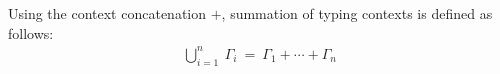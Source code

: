 \begin{definition}
Using the context concatenation $+$, summation of typing contexts is defined as follows:
\begin{align*}
\displaystyle \bigcup_{i=1}^{n} \ \Gamma_i\ =\ \Gamma_1 + \cdots + \Gamma_n
\end{align*}
\end{definition}


% 
